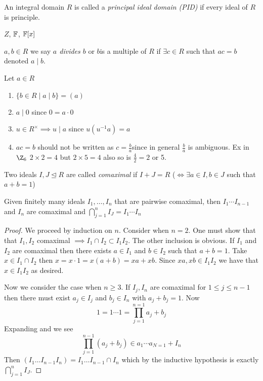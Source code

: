 \documentclass[master.tex]{subfiles}
\begin{document}
\begin{defn}
  An integral domain \(R\) is called a \emph{principal ideal domain (PID)} if every ideal of \(R\) is principle.
\end{defn}

\begin{examples}
  \(Z\), \(\mathbb{F}\), \(\mathbb{F}[x]\)
\end{examples}

\begin{notation}
  \(a,b \in R\) we say \emph{\(a\) divides \(b\)} or \(b\)is a multiple of \(R\) if \(\exists c \in R\) such that
  \(ac=b\) denoted \(a \mid b\).
\end{notation}

\begin{rmk} Let \(a \in R\)
  \begin{enumerate}[label=(\alph*)]
  \item \(\{b \in R \mid a \mid b\}=(a)\)
  \item \(a \mid 0\) since \(0=a \cdot 0 \)
  \item \(u \in R^\times \implies u \mid a\) since \(u(u^{-1}a)=a\)
  \item \(ac=b\) should not be written as \(c=\frac{b}{a}\)since in general \(\frac{b}{a}\) is ambiguous. Ex in \(\Z_6\)
    \(2 \times 2 = 4\) but \(2 \times 5 = 4\) also so is \(\frac{4}{2}=2\) or 5.
  \end{enumerate}
\end{rmk}

\begin{defn}
  Two ideals \(I, J \unlhd R\) are called \emph{comaximal} if \(I+J=R\) (\(\iff \exists a \in I, b \in J\) such that
  \(a+b=1\))
\end{defn}

\begin{lem}
  Given finitely many ideals \(I_1,\ldots, I_n\) that are pairwise comaximal, then \(I_1 \cdots I_{n-1}\) and \(I_n\)
  are comaximal and \(\bigcap_{j=1}^n I_J = I_1 \cdots I_n\)
\end{lem}

\begin{proof}
  We proceed by induction on \(n\). Consider when \(n=2\). One must show that that \(I_1,I_2\) comaximal
  \(\implies I_1 \cap I_2 \subset I_1I_2\). The other inclusion is obvious. If \(I_1\) and \(I_2\) are comaximal then
  there exists \(a \in I_1\) and \(b \in I_2\) such that \(a+b=1\). Take \(x \in I_1 \cap I_2\) then \(x=x \cdot 1 =
  x(a+b)=xa+xb\). Since \(xa,xb \in I_1 I_2\) we have that \(x \in I_1 I_2\) as desired.

  Now we consider the case when \(n \ge 3\). If \(I_j,I_n\) are comaximal for \(1 \le j \le n-1\) then there must exist
  \(a_j \in I_j\) and \(b_j \in I_n\) with \(a_j+b_j = 1\). Now
  \[1=1 \cdots 1 = \prod_{j=1}^{n=1}{a_j + b_j}\]
  Expanding and we see
  \[\prod_{j=1}^{n-1}(a_j+b_j) \in a_1 \cdots a_{N=1}+I_n\]
  Then \((I_1 \ldots I_{n-1}I_n)=I_1 \ldots I_{n-1} \cap I_n\)
  which by the inductive hypothesis is exactly \(\bigcap_{j=1}^n I_J\).
\end{proof}
\end{document}
